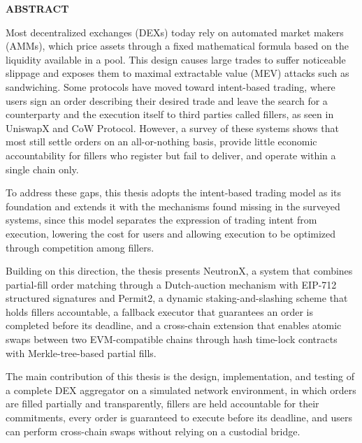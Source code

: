 \documentclass[../DoAn.tex]{subfiles}
\begin{document}
\begin{center}
    \Large{\textbf{ABSTRACT}}\\
\end{center}
\vspace{1cm}
Most decentralized exchanges (DEXs) today rely on automated market makers (AMMs), which price assets through a fixed mathematical formula based on the liquidity available in a pool. This design causes large trades to suffer noticeable slippage and exposes them to maximal extractable value (MEV) attacks such as sandwiching. Some protocols have moved toward intent-based trading, where users sign an order describing their desired trade and leave the search for a counterparty and the execution itself to third parties called fillers, as seen in UniswapX and CoW Protocol. However, a survey of these systems shows that most still settle orders on an all-or-nothing basis, provide little economic accountability for fillers who register but fail to deliver, and operate within a single chain only.

To address these gaps, this thesis adopts the intent-based trading model as its foundation and extends it with the mechanisms found missing in the surveyed systems, since this model separates the expression of trading intent from execution, lowering the cost for users and allowing execution to be optimized through competition among fillers.

Building on this direction, the thesis presents NeutronX, a system that combines partial-fill order matching through a Dutch-auction mechanism with EIP-712 structured signatures and Permit2, a dynamic staking-and-slashing scheme that holds fillers accountable, a fallback executor that guarantees an order is completed before its deadline, and a cross-chain extension that enables atomic swaps between two EVM-compatible chains through hash time-lock contracts with Merkle-tree-based partial fills.

The main contribution of this thesis is the design, implementation, and testing of a complete DEX aggregator on a simulated network environment, in which orders are filled partially and transparently, fillers are held accountable for their commitments, every order is guaranteed to execute before its deadline, and users can perform cross-chain swaps without relying on a custodial bridge.
\end{document}

